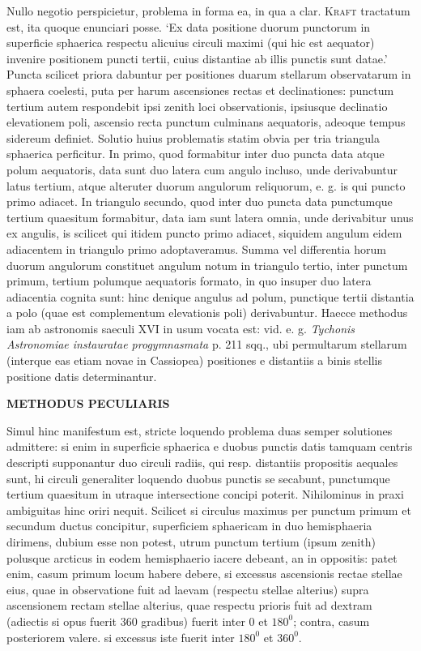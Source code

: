 Nullo negotio perspicietur, problema in forma ea, in qua a clar. \textsc{Kraft} tractatum est, ita quoque enunciari posse. `Ex data positione duorum punctorum in superficie sphaerica respectu alicuius circuli maximi (qui hic est aequator) invenire positionem puncti tertii, cuius distantiae ab illis punctis sunt datae.' Puncta scilicet priora dabuntur per positiones duarum stellarum observatarum in sphaera coelesti, puta per harum ascensiones rectas et declinationes: punctum tertium autem respondebit ipsi zenith loci observationis, ipsiusque declinatio elevationem poli, ascensio recta punctum culminans aequatoris, adeoque tempus sidereum definiet. Solutio huius problematis statim obvia per tria triangula sphaerica perficitur. In primo, quod formabitur inter duo puncta data atque polum aequatoris, data sunt duo latera cum angulo incluso, unde derivabuntur latus tertium, atque alteruter duorum angulorum reliquorum, e. g. is qui puncto primo adiacet. In triangulo secundo, quod inter duo puncta data punctumque tertium quaesitum formabitur, data iam sunt latera omnia, unde derivabitur unus ex angulis, is scilicet qui itidem puncto primo adiacet, siquidem angulum eidem adiacentem in triangulo primo adoptaveramus. Summa vel differentia horum duorum angulorum constituet angulum notum in triangulo tertio, inter punctum primum, tertium polumque aequatoris formato, in quo insuper duo latera adiacentia cognita sunt: hinc denique angulus ad polum, punctique tertii distantia a polo (quae est complementum elevationis poli) derivabuntur. Haecce methodus iam ab astronomis saeculi XVI in usum vocata est: vid. e. g. \textit{Tychonis Astronomiae instauratae progymnasmata} p. 211 sqq., ubi permultarum stellarum (interque eas etiam novae in Cassiopea) positiones e distantiis a binis stellis positione datis determinantur.

\par{}
\clearpage
\noindent{}%
%
\parbox[t]{\dimexpr\linewidth-24mm\relax}{\centering\fontsize{7.4}{9.2}\selectfont\bfseries METHODUS PECULIARIS\par}%
\makebox[12mm][r]{}\par\nobreak\smallskip
Simul hinc manifestum est, stricte loquendo problema duas semper solutiones admittere: si enim in superficie sphaerica e duobus punctis datis tamquam centris descripti supponantur duo circuli radiis, qui resp. distantiis propositis aequales sunt, hi circuli generaliter loquendo duobus punctis se secabunt, punctumque tertium quaesitum in utraque intersectione concipi poterit. Nihilominus in praxi ambiguitas hinc oriri nequit. Scilicet si circulus maximus per punctum primum et secundum ductus concipitur, superficiem sphaericam in duo hemisphaeria dirimens, dubium esse non potest, utrum punctum tertium (ipsum zenith) polusque arcticus in eodem hemisphaerio iacere debeant, an in oppositis: patet enim, casum primum locum habere debere, si excessus ascensionis rectae stellae eius, quae in observatione fuit ad laevam (respectu stellae alterius) supra ascensionem rectam stellae alterius, quae respectu prioris fuit ad dextram (adiectis si opus fuerit $360$ gradibus) fuerit inter $0$ et $180^0$; contra, casum posteriorem valere. si excessus iste fuerit inter $180^0$ et $360^0$.

